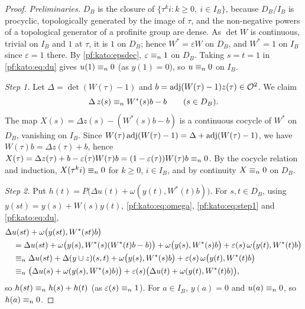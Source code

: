 \begin{proof}
\emph{Preliminaries.} $D_B$ is the closure of $\{\tau^ki:k\ge0,\ i\in I_B\}$, because $D_B/I_B$ is procyclic,
topologically generated by the image of $\tau$, and the non-negative powers of a topological generator of a profinite
group are dense. As $\det W$ is continuous, trivial on $I_B$ and $1$ at $\tau$, it is $1$ on $D_B$; hence $W^*=\varepsilon W$ on
$D_B$, and $W^*=1$ on $I_B$ since $\varepsilon=1$ there. By \cref{pf:kato:epsdec}, $\varepsilon\equiv_{n}1$ on $D_B$. Taking $s=t=1$ in
\eqref{pf:kato:eq:du} gives $u(1)\equiv_{n}0$ (as $y(1)=0$), so $u\equiv_{n}0$ on $I_B$.

\emph{Step 1.} Let $\Delta=\det(W(\tau)-1)$ and $b=\operatorname{adj}(W(\tau)-1)z(\tau)\in\mathcal{O}^2$. We claim
\begin{equation}\label{pf:kato:eq:step1}
  \Delta\,z(s)\equiv_{n}W^*(s)b-b\qquad(s\in D_B).
\end{equation}
The map $X(s)=\Delta z(s)-(W^*(s)b-b)$ is a continuous cocycle of $W^*$ on $D_B$, vanishing on $I_B$. Since
$W(\tau)\operatorname{adj}(W(\tau)-1)=\Delta+\operatorname{adj}(W(\tau)-1)$, we have $W(\tau)b=\Delta z(\tau)+b$, hence
$X(\tau)=\Delta z(\tau)+b-\varepsilon(\tau)W(\tau)b=(1-\varepsilon(\tau))W(\tau)b\equiv_{n}0$. By the cocycle relation and induction,
$X(\tau^ki)\equiv_{n}0$ for $k\ge0$, $i\in I_B$, and by continuity $X\equiv_{n}0$ on $D_B$.

\emph{Step 2.} Put $h(t)=P\bigl(\Delta u(t)+\omega(y(t),W^*(t)b)\bigr)$. For $s,t\in D_B$, using $y(st)=y(s)+W(s)y(t)$,
\eqref{pf:kato:eq:omega}, \eqref{pf:kato:eq:step1} and \eqref{pf:kato:eq:du},
\[
\begin{aligned}
&\Delta u(st)+\omega\bigl(y(st),W^*(st)b\bigr)\\
&\quad=\Delta u(st)+\omega\bigl(y(s),W^*(s)(W^*(t)b-b)\bigr)+\omega\bigl(y(s),W^*(s)b\bigr)
  +\varepsilon(s)\,\omega\bigl(y(t),W^*(t)b\bigr)\\
&\quad\equiv_{n}\Delta u(st)+\Delta(y\cup z)(s,t)+\omega\bigl(y(s),W^*(s)b\bigr)+\varepsilon(s)\,\omega\bigl(y(t),W^*(t)b\bigr)\\
&\quad\equiv_{n}\bigl(\Delta u(s)+\omega(y(s),W^*(s)b)\bigr)+\varepsilon(s)\bigl(\Delta u(t)+\omega(y(t),W^*(t)b)\bigr),
\end{aligned}
\]
so $h(st)\equiv_{n}h(s)+h(t)$ (as $\varepsilon(s)\equiv_{n}1$). For $a\in I_B$, $y(a)=0$ and $u(a)\equiv_{n}0$, so $h(a)\equiv_{n}0$.


\end{proof}
